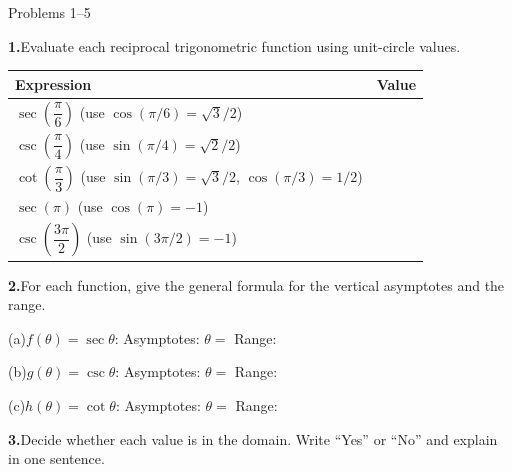 \documentclass[10pt]{article}
\begin{document}
\namedateperiod

\vspace{0.10in}

\begin{notesbox}{Problems 1--5}

\textbf{1.}\quad Evaluate each reciprocal trigonometric function using unit-circle values.

\vspace{4pt}
\renewcommand{\arraystretch}{1.5}
\begin{tabular}{|l|c|}
\hline
\textbf{Expression} & \textbf{Value} \\
\hline
$\sec\!\left(\dfrac{\pi}{6}\right)$ (use $\cos(\pi/6) = \sqrt{3}/2$) & \\
\hline
$\csc\!\left(\dfrac{\pi}{4}\right)$ (use $\sin(\pi/4) = \sqrt{2}/2$) & \\
\hline
$\cot\!\left(\dfrac{\pi}{3}\right)$ (use $\sin(\pi/3) = \sqrt{3}/2$, $\cos(\pi/3) = 1/2$) & \\
\hline
$\sec(\pi)$ (use $\cos(\pi) = -1$) & \\
\hline
$\csc\!\left(\dfrac{3\pi}{2}\right)$ (use $\sin(3\pi/2) = -1$) & \\
\hline
\end{tabular}

\vspace{0.12in}
\textbf{2.}\quad For each function, give the general formula for the vertical asymptotes
and the range.

\vspace{4pt}
(a)\quad $f(\theta) = \sec\theta$: \quad Asymptotes: $\theta = $ \underline{\hspace{3.5cm}}
\quad Range: \underline{\hspace{4cm}}

\vspace{6pt}
(b)\quad $g(\theta) = \csc\theta$: \quad Asymptotes: $\theta = $ \underline{\hspace{3.5cm}}
\quad Range: \underline{\hspace{4cm}}

\vspace{6pt}
(c)\quad $h(\theta) = \cot\theta$: \quad Asymptotes: $\theta = $ \underline{\hspace{3.5cm}}
\quad Range: \underline{\hspace{4cm}}

\vspace{0.12in}
\textbf{3.}\quad Decide whether each value is in the domain. Write ``Yes'' or ``No''
and explain in one sentence.


\end{notesbox}
\end{document}
